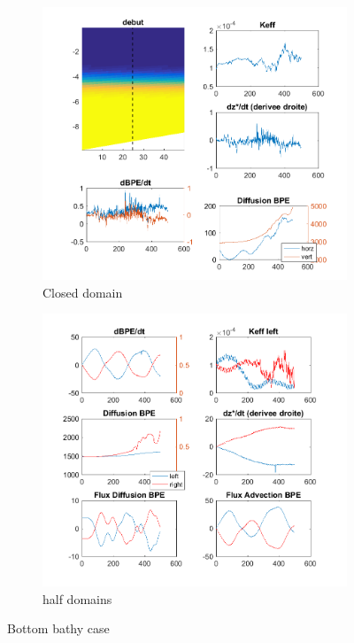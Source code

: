 \begin{figure}[h!]
\begin{subfigure}{.5\textwidth}
\includegraphics[width=1.\textwidth]{./CHAP_BPE/AGBPE_numlab9_all.png}
\caption{Closed domain}
\end{subfigure}
%
\begin{subfigure}{.5\textwidth}
\includegraphics[width=1.\textwidth]{./CHAP_BPE/AGBPE_numlab9_halves.png}
\caption{half domains}
\end{subfigure}
\caption{Bottom bathy case}
\end{figure}

